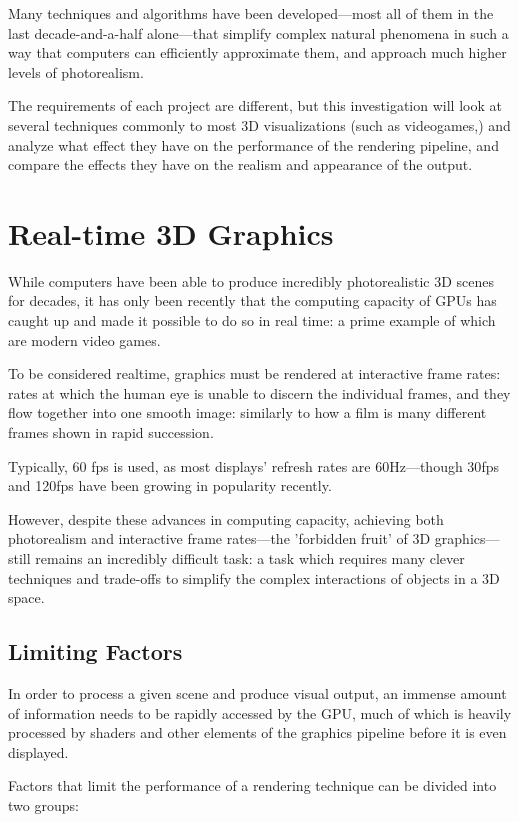 \documentclass[11pt, oneside]{report}
\begin{document}
Many techniques and algorithms have been developed—most all of them in the last decade-and-a-half alone—that simplify complex natural phenomena in such a way that computers can efficiently approximate them, and approach much higher levels of photorealism.

The requirements of each project are different, but this investigation will look at several techniques commonly to most 3D visualizations (such as videogames,) and analyze what effect they have on the performance of the rendering pipeline, and compare the effects they have on the realism and appearance of the output.

\section{Real-time 3D Graphics}
While computers have been able to produce incredibly photorealistic 3D scenes for decades, it has only been recently that the computing capacity of \glspl{GPU} has caught up and made it possible to do so in real time: a prime example of which are modern video games.

To be considered realtime, graphics must be rendered at interactive \glspl{frame rate}: rates at which the human eye is unable to discern the individual frames, and they flow together into one smooth image: similarly to how a film is many different frames shown in rapid succession.

Typically, 60 \gls{fps} is used, as most displays' \glspl{refresh rate} are 60Hz---though 30\gls{fps} and 120\gls{fps} have been growing in popularity recently.

However, despite these advances in computing capacity, achieving both photorealism and interactive \glspl{frame rate}---the 'forbidden fruit' of 3D graphics---still remains an incredibly difficult task: a task which requires many clever techniques and trade-offs to simplify the complex interactions of objects in a 3D space.

\subsection{Limiting Factors}
In order to process a given scene and produce visual output, an immense amount of information needs to be rapidly accessed by the \gls{GPU}, much of which is heavily processed by \glspl{shader} and other elements of the \gls{graphics pipeline} before it is even displayed.

Factors that limit the performance of a rendering technique can be divided into two groups:
\end{document}
